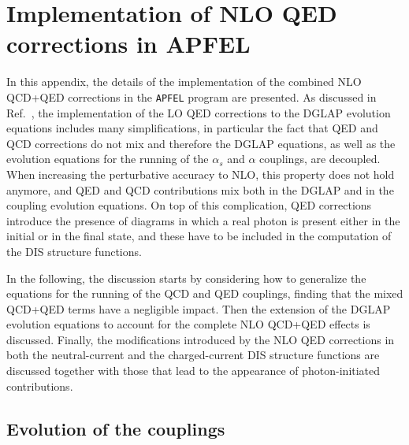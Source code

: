 \appendix
\section{Implementation of NLO QED corrections in APFEL}
\label{sec:appendixAPFEL}

In this appendix, the details of the implementation of the
combined NLO QCD+QED corrections in the {\tt APFEL} program are presented.
%
As discussed in Ref.~\cite{Bertone:2013vaa}, the implementation of the
LO QED corrections to the DGLAP evolution equations includes many
simplifications, in particular the fact that QED and QCD corrections
do not mix and therefore the DGLAP equations, as well as the evolution
equations for the running of the $\alpha_s$ and $\alpha$ couplings,
are decoupled.
%
When increasing the perturbative accuracy to NLO,
this property does not hold anymore, and QED and QCD
contributions mix both in the DGLAP and in the coupling evolution
equations.
%
On top of this complication, QED corrections introduce the presence of
diagrams in which a real photon is present either in the initial or in
the final state, and these have to be included in the computation of the
DIS structure functions.

In the following, the discussion starts by considering how to generalize the equations for
the running of the QCD and QED couplings, finding that the mixed
QCD+QED terms have a negligible impact.
%
Then the extension of the DGLAP evolution equations
to account for the complete NLO QCD+QED effects is discussed.
%
Finally, the modifications introduced by the NLO QED
corrections in both the neutral-current and the charged-current DIS
structure functions are discussed together with those that lead to the 
appearance of photon-initiated
contributions.

\subsection{Evolution of the couplings}


